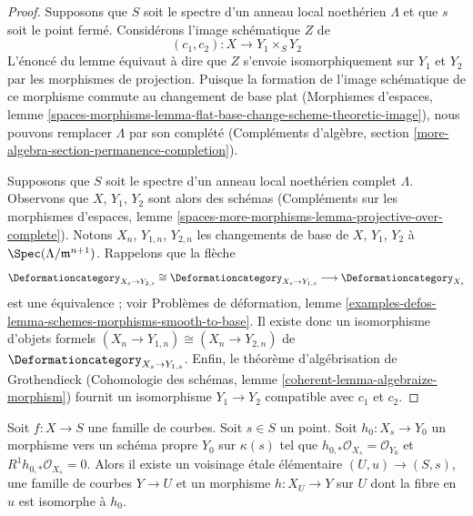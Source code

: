 \begin{proof}
\medskip\noindent
Supposons que $S$ soit le spectre d'un anneau local noethérien $\Lambda$ et que
$s$ soit le point fermé. Considérons l'image schématique $Z$ de
$$
(c_1, c_2) : X \longrightarrow Y_1 \times_S Y_2
$$
L'énoncé du lemme équivaut à dire que $Z$ s'envoie
isomorphiquement sur $Y_1$ et $Y_2$ par les morphismes de projection.
Puisque la formation de l'image schématique de ce morphisme commute
au changement de base plat (Morphismes d'espaces, lemme
\ref{spaces-morphisms-lemma-flat-base-change-scheme-theoretic-image}),
nous pouvons remplacer $\Lambda$ par son complété
(Compléments d'algèbre, section \ref{more-algebra-section-permanence-completion}).

\medskip\noindent
Supposons que $S$ soit le spectre d'un anneau local noethérien complet $\Lambda$.
Observons que $X$, $Y_1$, $Y_2$ sont alors des schémas
(Compléments sur les morphismes d'espaces, lemme
\ref{spaces-more-morphisms-lemma-projective-over-complete}).
Notons $X_n$, $Y_{1, n}$, $Y_{2, n}$ les changements de base de
$X$, $Y_1$, $Y_2$ à $\Spec(\Lambda/\mathfrak m^{n + 1})$.
Rappelons que la flèche
$$
\Deformationcategory_{X_s \to Y_{2, s}} \cong
\Deformationcategory_{X_s \to Y_{1, s}} \longrightarrow
\Deformationcategory_{X_s}
$$
est une équivalence ; voir Problèmes de déformation, lemme
\ref{examples-defos-lemma-schemes-morphisms-smooth-to-base}.
Il existe donc un isomorphisme d'objets formels
$(X_n \to Y_{1, n}) \cong (X_n \to Y_{2, n})$
de $\Deformationcategory_{X_s \to Y_{1, s}}$.
Enfin, le théorème d'algébrisation de Grothendieck
(Cohomologie des schémas, lemme \ref{coherent-lemma-algebraize-morphism})
fournit un isomorphisme $Y_1 \to Y_2$ compatible avec $c_1$ et $c_2$.
\end{proof}

\begin{lemma}
\label{lemma-contract-basic}
Soit $f : X \to S$ une famille de courbes. Soit $s \in S$ un point.
Soit $h_0 : X_s \to Y_0$ un morphisme vers un schéma propre $Y_0$ sur $\kappa(s)$
tel que $h_{0, *}\mathcal{O}_{X_s} = \mathcal{O}_{Y_0}$ et
$R^1h_{0, *}\mathcal{O}_{X_s} = 0$. Alors il existe un voisinage
étale élémentaire $(U, u) \to (S, s)$, une famille de courbes $Y \to U$
et un morphisme $h : X_U \to Y$ sur $U$ dont la fibre en $u$
est isomorphe à $h_0$.
\end{lemma}

